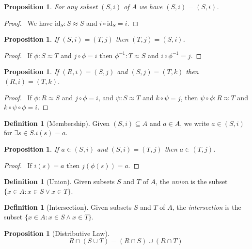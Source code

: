 \documentclass{book}
\let\qed\relax
\newtheorem{prop}[ax]{Proposition}
\theoremstyle{definition}
\newtheorem{df}[ax]{Definition}
\newcommand{\id}[1]{\ensuremath{\mathrm{id}_{#1}}}
\newcommand{\inv}[1]{\ensuremath{{#1}^{-1}}}
\begin{document}
\begin{prop}
For any subset $(S,i)$ of $A$ we have $(S,i) = (S,i)$.
\end{prop}

\begin{proof}
\pf\ We have $\id{S} : S \approx S$ and $i \circ \id{S} = i$.
\end{proof}

\begin{prop}
If $(S,i) = (T,j)$ then $(T,j) = (S,i)$.
\end{prop}

\begin{proof}
\pf\ If $\phi : S \approx T$ and $j \circ \phi = i$ then $\inv{\phi} : T \approx S$ and $i \circ \inv{\phi} = j$. \qed
\end{proof}

\begin{prop}
If $(R,i) = (S,j)$ and $(S,j) = (T,k)$ then $(R,i) = (T,k)$.
\end{prop}

\begin{proof}
\pf\ If $\phi : R \approx S$ and $j \circ \phi = i$, and $\psi : S \approx T$ and $k \circ \psi = j$, then $\psi \circ \phi : R \approx T$ and $k \circ \psi \circ \phi = i$. \qed
\end{proof}

\begin{df}[Membership]
Given $(S,i) \subseteq A$ and $a \in A$, we write $a \in (S,i)$ for $\exists s \in S. i(s) = a$.
\end{df}

\begin{prop}
If $a \in (S,i)$ and $(S,i) = (T,j)$ then $a \in (T,j)$.
\end{prop}

\begin{proof}
\pf\ If $i(s) = a$ then $j(\phi(s)) = a$. \qed
\end{proof}

\begin{df}[Union]
Given subsets $S$ and $T$ of $A$, the \emph{union} is the subset $\{ x \in A : x \in S \vee x \in T \}$.
\end{df}

\begin{df}[Intersection]
Given subsets $S$ and $T$ of $A$, the \emph{intersection} is the subset $\{ x \in A : x \in S \wedge x \in T \}$.
\end{df}

\begin{prop}[Distributive Law]
\[ R \cap (S \cup T) = (R \cap S) \cup (R \cap T) \]
\end{prop}
\end{document}
